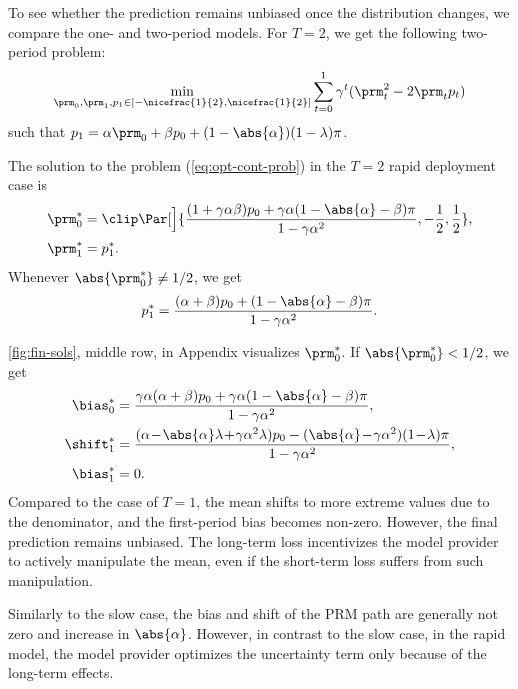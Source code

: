  To see whether the prediction remains unbiased once the distribution changes, we
compare the one- and two-period models. For $T=2$, we get the following two-period
problem:
\[
    \min_{\prm_0, \prm_1, p_1 \in [-\nicefrac{1}{2}, \nicefrac{1}{2}]}
    \sum_{t=0}^1 \gamma^t (\prm_t^2 - 2 \prm_t p_t)
\]
such that $p_1 = \alpha \prm_0 + \beta p_0 + (1 - \abs{\alpha}) (1 - \lambda)
\pi$.

\begin{proposition}
    \label{thm:two-rapid-sol}
    The solution to the problem (\ref{eq:opt-cont-prob}) in the $T=2$ rapid deployment case is
    \[
        \begin{split}
            \prm^*_0 &= \clip\Par[\Big]{\frac{(1 + \gamma \alpha \beta) p_0 +
            \gamma \alpha (1 - \abs{\alpha} - \beta) \pi}{1 - \gamma \alpha^2},
            -\frac{1}{2}, \frac{1}{2}},\\
            \prm^*_1 &= p^*_1.
        \end{split}
    \]
    Whenever $\abs{\prm^*_0} \neq 1 / 2$, we get
    \[
        p^*_1 = \frac{(\alpha + \beta) p_0 + (1 - \abs{\alpha} - \beta) \pi}{1
        - \gamma \alpha^2}.
    \]
\end{proposition}

\cref{fig:fin-sols}, middle row, in Appendix visualizes $\prm^*_0$. If $\abs{\prm^*_0} < 1/2$, we get
\[
    \begin{split}
        \bias^*_0 & = \frac{\gamma \alpha (\alpha + \beta)
        p_0 + \gamma \alpha (1 - \abs{\alpha} - \beta) \pi}{1 - \gamma
        \alpha^2},\\
        \shift^*_1 & = \frac{(\alpha \! - \! \abs{\alpha} \lambda \! + \!
        \gamma \alpha^2 \lambda) p_0 - (\abs{\alpha} \! - \! \gamma \alpha^2)
        (1 \! - \! \lambda) \pi}{1 - \gamma \alpha^2},\\
        \bias^*_1 & = 0.
    \end{split}
\]
Compared to the case of $T=1$, the mean shifts to more extreme values due
to the denominator, and the first-period bias becomes non-zero. However, the
final prediction remains unbiased. The long-term loss incentivizes the
model provider to actively manipulate the mean, even if the short-term loss
suffers from such manipulation.

 Similarly to the slow case, the bias and shift of the PRM path are
generally not zero and increase in $\abs{\alpha}$. However, in contrast to the
slow case, in the rapid model, the model provider optimizes the uncertainty
term only because of the long-term effects.
